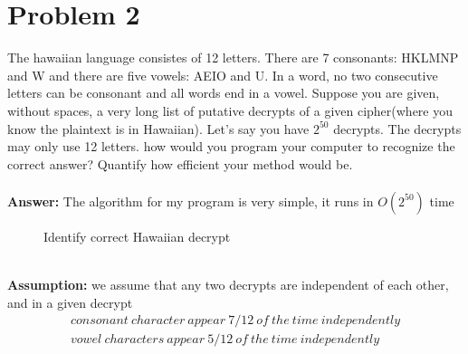\documentclass[12pt,letterpaper]{article}
\begin{document}
\section*{Problem 2}
    The hawaiian language consistes of 12 letters. There are 7 consonants: HKLMNP and W and there are five vowels: AEIO and U.  In a word, no two consecutive letters can be consonant and all words end in a vowel.  Suppose you are given, without spaces, a very long list of putative decrypts of a given cipher(where you know the plaintext is in Hawaiian). Let's say you have $2^{50}$ decrypts. The decrypts may only use 12 letters. how would you program your computer to recognize the correct answer? Quantify how efficient your method would be. \\ \\
    \textbf{Answer:} The algorithm for my program is very simple, it runs in $O(2^{50})$ time
    \begin{figure}[ht]
      \centering
      \begin{minipage}{.7\linewidth}
        \begin{algorithm}[H]
        \SetAlgoLined
         \caption{Identify correct Hawaiian decrypt}
        \end{algorithm}
      \end{minipage}
    \end{figure}
    \\
    \textbf{Assumption:} we assume that any two decrypts are independent of each other, and in a given decrypt
    \begin{align}
      consonant \ character \ appear \ 7/12 \ of \  the \ time \ independently\\
      vowel \ characters \ appear \ 5/12 \ of \ the \ time \ independently 
    \end{align}
   
\end{document}
